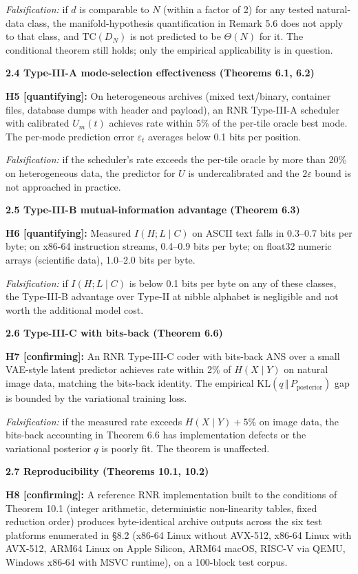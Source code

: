 \documentclass[
]{article}
\begin{document}
\emph{Falsification:} if $d$ is comparable to $N$ (within a factor
of 2) for any tested natural-data class, the manifold-hypothesis
quantification in Remark 5.6 does not apply to that class, and
$\mathrm{TC}(D_N)$ is not predicted to be $\Theta(N)$ for it. The
conditional theorem still holds; only the empirical applicability is
in question.

\textbf{2.4 Type-III-A mode-selection effectiveness (Theorems 6.1,
6.2)}

\textbf{H5 {[}quantifying{]}:} On heterogeneous archives (mixed
text/binary, container files, database dumps with header and
payload), an RNR Type-III-A scheduler with calibrated $U_m(t)$
achieves rate within 5\% of the per-tile oracle best mode. The
per-mode prediction error $\varepsilon_t$ averages below 0.1 bits
per position.

\emph{Falsification:} if the scheduler's rate exceeds the per-tile
oracle by more than 20\% on heterogeneous data, the predictor for
$U$ is undercalibrated and the $2\varepsilon$ bound is not
approached in practice.

\textbf{2.5 Type-III-B mutual-information advantage (Theorem 6.3)}

\textbf{H6 {[}quantifying{]}:} Measured $I(H ; L \mid C)$ on ASCII
text falls in 0.3--0.7 bits per byte; on x86-64 instruction streams,
0.4--0.9 bits per byte; on float32 numeric arrays (scientific data),
1.0--2.0 bits per byte.

\emph{Falsification:} if $I(H ; L \mid C)$ is below 0.1 bits per
byte on any of these classes, the Type-III-B advantage over Type-II
at nibble alphabet is negligible and not worth the additional model
cost.

\textbf{2.6 Type-III-C with bits-back (Theorem 6.6)}

\textbf{H7 {[}confirming{]}:} An RNR Type-III-C coder with
bits-back ANS over a small VAE-style latent predictor achieves rate
within 2\% of $H(X \mid Y)$ on natural image data, matching the
bits-back identity. The empirical
$\mathrm{KL}(q \,\Vert\, P_{\text{posterior}})$ gap is bounded by
the variational training loss.

\emph{Falsification:} if the measured rate exceeds
$H(X \mid Y) + 5\%$ on image data, the bits-back accounting in
Theorem 6.6 has implementation defects or the variational posterior
$q$ is poorly fit. The theorem is unaffected.

\textbf{2.7 Reproducibility (Theorems 10.1, 10.2)}

\textbf{H8 {[}confirming{]}:} A reference RNR implementation built to
the conditions of Theorem 10.1 (integer arithmetic, deterministic
non-linearity tables, fixed reduction order) produces byte-identical
archive outputs across the six test platforms enumerated in §8.2
(x86-64 Linux without AVX-512, x86-64 Linux with AVX-512, ARM64 Linux
on Apple Silicon, ARM64 macOS, RISC-V via QEMU, Windows x86-64 with
MSVC runtime), on a 100-block test corpus.
\end{document}
